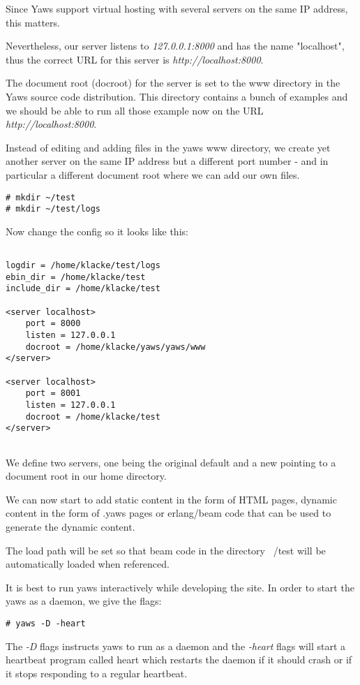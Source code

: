 \documentclass[11pt,oneside,english]{book}
\begin{document}
Since Yaws support virtual hosting with several servers on the same
IP address, this matters.

Nevertheless, our server listens to \textit{127.0.0.1:8000} and 
has the name "localhost", thus the correct URL for this server
is \textit{http://localhost:8000}.

The document root (docroot) for the server is set to the www directory in the
Yaws source code distribution. This directory contains a bunch of
examples and we should be able to run all those example now on the
URL  \textit{http://localhost:8000}.

Instead of editing and adding files in the yaws www directory, we 
create yet another server on the same IP address but a different port
number - and in particular a different document root where we can add
our own files.

\begin{verbatim}
# mkdir ~/test
# mkdir ~/test/logs
\end{verbatim}

Now change the config so it looks like this:

\begin{verbatim}

logdir = /home/klacke/test/logs
ebin_dir = /home/klacke/test
include_dir = /home/klacke/test

<server localhost>
	port = 8000
	listen = 127.0.0.1
	docroot = /home/klacke/yaws/yaws/www
</server>

<server localhost>
	port = 8001
	listen = 127.0.0.1
	docroot = /home/klacke/test
</server>


\end{verbatim}

We define two servers, one being the original default
and a new pointing to a document root in our home directory.

We can now start to add static content in the form of
HTML pages, dynamic content in the form of .yaws pages or
erlang/beam code that can be used to generate the dynamic content.

The load path will be set so that beam code in the directory ~/test
will be automatically loaded when referenced.

It is best to run yaws interactively while developing the site.
In order to start the yaws as a daemon, we give the flags:
\begin{verbatim}
# yaws -D -heart
\end{verbatim}

The \textit{-D} flags instructs yaws to run as a daemon and the 
\textit{-heart} flags will start a heartbeat program called heart
which restarts the daemon if it should crash or if it stops responding to
a regular heartbeat.
\end{document}
